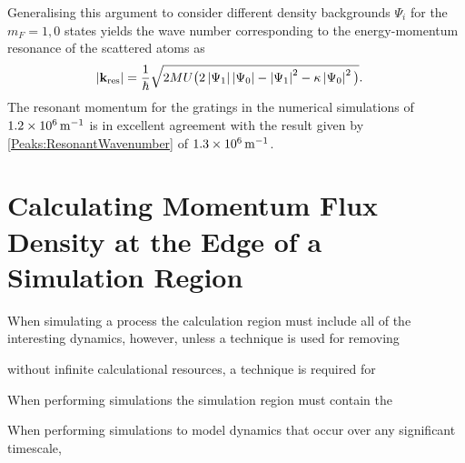 Generalising this argument to consider different density backgrounds $\Psi_i$ for the $m_F=1, 0$ states yields the wave number corresponding to the energy-momentum resonance of the scattered atoms as
\begin{align}
    \abs{\mathbf{k}_\text{res}} &= \frac{1}{\hbar} \sqrt{2 M U \big(2 \abs{\Psi_1}\abs{\Psi_0} - \abs{\Psi_1}^2 - \kappa \abs{\Psi_0}^2\big)} \label{Peaks:ResonantWavenumber}.
\end{align}
The resonant momentum for the gratings in the numerical simulations of $\unit[1.2\times 10^6]{m}^{-1}$ is in excellent agreement with the result given by \eqref{Peaks:ResonantWavenumber} of $\unit[1.3\times 10^6]{m}^{-1}$.



\section{Calculating Momentum Flux Density at the Edge of a Simulation Region}
When simulating a process the calculation region must include all of the interesting dynamics, however, unless a technique is used for removing 

without infinite calculational resources, a technique is required for 


When performing simulations the simulation region must contain the 


When performing simulations to model dynamics that occur over any significant timescale, 
